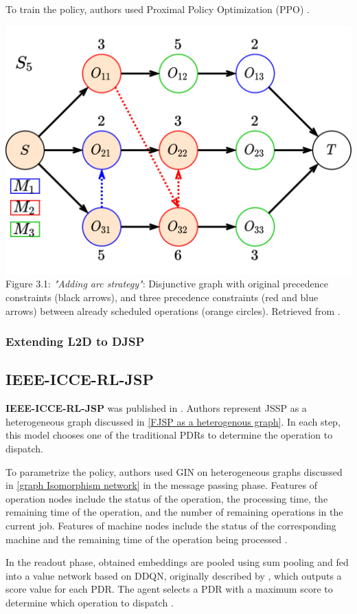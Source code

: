 To train the policy, authors used Proximal Policy Optimization (PPO) \cite{DBLP:journals/corr/SchulmanWDRK17}.\\
\begin{center}
    \includegraphics[width=0.75\linewidth]{images/jssp_adding_arcs.pdf}\\
    Figure 3.1: \textit{"Adding arc strategy"}: Disjunctive graph with original precedence constraints (black arrows), and three precedence constraints (red and blue arrows) between already scheduled operations (orange circles). Retrieved from \cite{zhang2020learning}.
\end{center}

\subsubsection{Extending L2D to DJSP}


\subsection{IEEE-ICCE-RL-JSP}

\textbf{IEEE-ICCE-RL-JSP} was published in \cite{10226873}. Authors represent JSSP as a heterogeneous graph discussed in \ref{FJSP as a heterogenous graph}. In each step, this model chooses one of the traditional PDRs to determine the operation to dispatch.
\par
To parametrize the policy, authors used GIN on heterogeneous graphs discussed in \ref{graph Isomorphism network} in the message passing phase. Features of operation nodes include the status of the operation, the processing time, the remaining time of the operation, and the number of remaining operations in the current job. Features of machine nodes include the status of the corresponding machine and the remaining time of the operation being processed \cite{10226873}.
\par
In the readout phase, obtained embeddings are pooled using sum pooling and fed into a value network based on DDQN, originally described by \cite{DBLP:journals/corr/HasseltGS15}, which outputs a score value for each PDR. The agent selects a PDR with a maximum score to determine which operation to dispatch \cite{10226873}.

